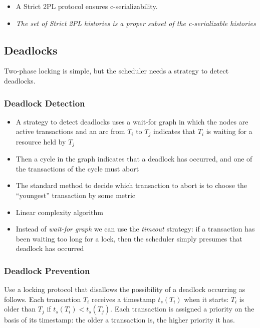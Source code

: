 \begin{tcolorbox}
\begin{itemize}
    \item A Strict 2PL protocol ensures c-serializability.
    \item \textit{The set of Strict 2PL histories is a proper subset of the c-serializable histories}
\end{itemize}
\end{tcolorbox}

\subsection{Deadlocks}
Two-phase locking is simple, but the scheduler needs a strategy to detect deadlocks.

\subsubsection{Deadlock Detection}
\begin{itemize}
    \item A strategy to detect deadlocks uses a wait-for graph in which the nodes are active transactions and an arc from $T_i$ to $T_j$ indicates that $T_i$ is waiting for a resource held by $T_j$
    \item Then a cycle in the graph indicates that a deadlock has occurred, and one of the transactions of the cycle must abort
    \item The standard method to decide which transaction to abort is to choose the “youngest” transaction by some metric
    \item Linear complexity algorithm
    \item Instead of \textit{wait-for graph} we can use the \textit{timeout} strategy: if a transaction has been waiting too long for a lock, then the scheduler simply presumes that deadlock has occurred
\end{itemize}

\subsubsection{Deadlock Prevention}
Use a locking protocol that disallows the possibility of a deadlock occurring as follows. Each transaction $T_i$ receives a timestamp $t_s(T_i)$ when it starts: $T_i$ is older than $T_j$ if $t_s(T_i) < t_s(T_j)$. Each transaction is assigned a priority on the basis of its timestamp: the older a transaction is, the higher priority it has.

